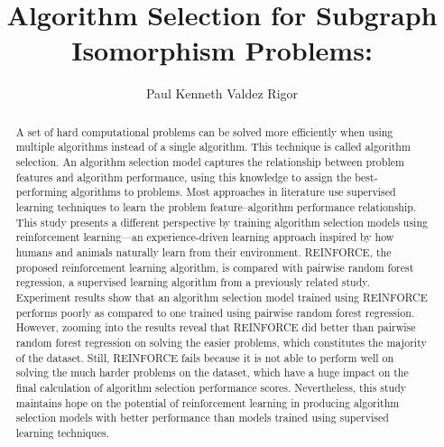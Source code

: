 \documentclass{utmthesis}
\begin{document}
\title{Algorithm Selection for Subgraph Isomorphism Problems:}
\author{Paul Kenneth Valdez Rigor}


\watermarkpage

\coverpage
\superpage
\certification
\frontmatter
\maketitle
\declaration

\begin{abstract}
A set of hard computational problems can be solved more efficiently when using multiple algorithms instead of a single algorithm. This technique is called algorithm selection. An algorithm selection model captures the relationship between problem features and algorithm performance, using this knowledge to assign the best-performing algorithms to problems. Most approaches in literature use supervised learning techniques to learn the problem feature–algorithm performance relationship. This study presents a different perspective by training algorithm selection models using reinforcement learning---an experience-driven learning approach inspired by how humans and animals naturally learn from their environment. REINFORCE, the proposed reinforcement learning algorithm, is compared with pairwise random forest regression, a supervised learning algorithm from a previously related study. Experiment results show that an algorithm selection model trained using REINFORCE performs poorly as compared to one trained using pairwise random forest regression. However, zooming into the results reveal that REINFORCE did better than pairwise random forest regression on solving the easier problems, which constitutes the majority of the dataset. Still, REINFORCE fails because it is not able to perform well on solving the much harder problems on the dataset, which have a huge impact on the final calculation of algorithm selection performance scores. Nevertheless, this study maintains hope on the potential of reinforcement learning in producing algorithm selection models with better performance than models trained using supervised learning techniques. 
\end{abstract}
\end{document}
